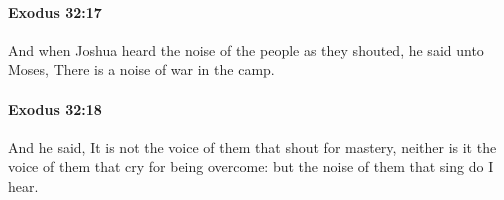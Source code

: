 		\paragraph{Exodus 32:17} %
			\label{EXODUS-32-17}

			And when Joshua heard the noise of the people as they shouted, he said unto Moses, There is a noise of war in the camp.


		\paragraph{Exodus 32:18} %
			\label{EXODUS-32-18}

			And he said, It is not the voice of them that shout for mastery, neither is it the voice of them that cry for being overcome: but the noise of them that sing do I hear.


